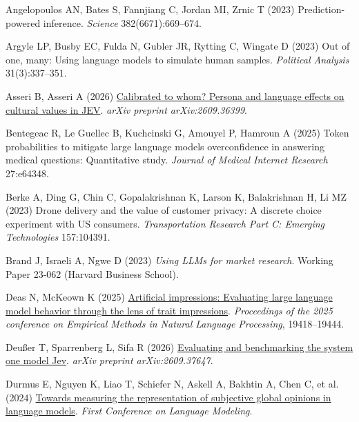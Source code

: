 \documentclass[
  11pt,
  letterpaper,
]{article}
\newlength{\cslhangindent}
\newenvironment{CSLReferences}[2] %
 {\begin{list}{}{%
  \setlength{\itemindent}{0pt}
  \setlength{\leftmargin}{0pt}
  \setlength{\parsep}{0pt}
  \ifodd #1
   \setlength{\leftmargin}{\cslhangindent}
   \setlength{\itemindent}{-1\cslhangindent}
  \fi
  \setlength{\itemsep}{#2\baselineskip}}}
 {\end{list}}
\begin{document}
\protect{}\label{refs}
\begin{CSLReferences}{1}{0}
Angelopoulos AN, Bates S, Fannjiang C, Jordan MI, Zrnic T (2023)
Prediction-powered inference. \emph{Science} 382(6671):669--674.

Argyle LP, Busby EC, Fulda N, Gubler JR, Rytting C, Wingate D (2023) Out
of one, many: Using language models to simulate human samples.
\emph{Political Analysis} 31(3):337--351.

Asseri B, Asseri A (2026)
\href{https://arxiv.org/abs/2609.36399}{Calibrated to whom? Persona and
language effects on cultural values in {JEV}}. \emph{arXiv preprint
arXiv:2609.36399}.

Bentegeac R, Le Guellec B, Kuchcinski G, Amouyel P, Hamroun A (2025)
Token probabilities to mitigate large language models overconfidence in
answering medical questions: Quantitative study. \emph{Journal of
Medical Internet Research} 27:e64348.

Berke A, Ding G, Chin C, Gopalakrishnan K, Larson K, Balakrishnan H, Li
MZ (2023) Drone delivery and the value of customer privacy: A discrete
choice experiment with US consumers. \emph{Transportation Research Part
C: Emerging Technologies} 157:104391.

Brand J, Israeli A, Ngwe D (2023) \emph{Using {LLMs} for market
research}. Working Paper 23-062 (Harvard Business School).

Deas N, McKeown K (2025)
\href{https://doi.org/10.18653/v1/2025.emnlp-main.981}{Artificial
impressions: Evaluating large language model behavior through the lens
of trait impressions}. \emph{Proceedings of the 2025 conference on
{Empirical Methods in Natural Language Processing}}, 19418--19444.

Deußer T, Sparrenberg L, Sifa R (2026)
\href{https://arxiv.org/abs/2609.37647}{Evaluating and benchmarking the
system one model {Jev}}. \emph{arXiv preprint arXiv:2609.37647}.

Durmus E, Nguyen K, Liao T, Schiefer N, Askell A, Bakhtin A, Chen C, et
al. (2024) \href{https://openreview.net/forum?id=zl16jLb91v}{Towards
measuring the representation of subjective global opinions in language
models}. \emph{First {Conference on Language Modeling}}.


\end{CSLReferences}
\end{document}
